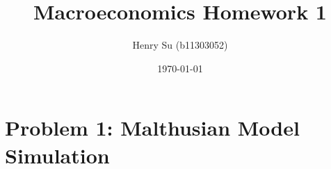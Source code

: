 \documentclass[12pt]{article}
\title{Macroeconomics Homework 1}
\author{Henry Su (b11303052)}
\date{\today}   %
\begin{document}
\maketitle
\thispagestyle{empty}  %


\vspace{1cm} %

\section*{Problem 1: Malthusian Model Simulation}
\end{document}
